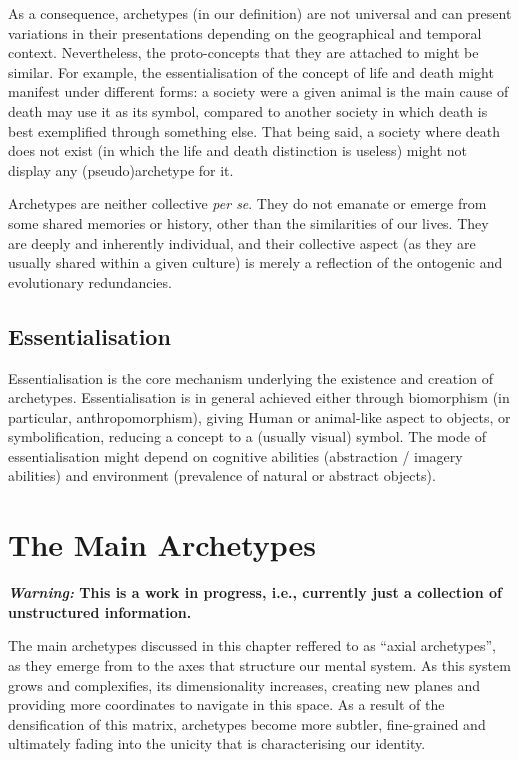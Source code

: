 \documentclass[]{book}
\begin{document}
As a consequence, archetypes (in our definition) are not universal and can present variations in their presentations depending on the geographical and temporal context. Nevertheless, the proto-concepts that they are attached to might be similar. For example, the essentialisation of the concept of life and death might manifest under different forms: a society were a given animal is the main cause of death may use it as its symbol, compared to another society in which death is best exemplified through something else. That being said, a society where death does not exist (in which the life and death distinction is useless) might not display any (pseudo)archetype for it.

Archetypes are neither collective \emph{per se}. They do not emanate or emerge from some shared memories or history, other than the similarities of our lives. They are deeply and inherently individual, and their collective aspect (as they are usually shared within a given culture) is merely a reflection of the ontogenic and evolutionary redundancies.

\hypertarget{essentialisation}{%
\section{Essentialisation}\label{essentialisation}}

Essentialisation is the core mechanism underlying the existence and creation of archetypes. Essentialisation is in general achieved either through biomorphism (in particular, anthropomorphism), giving Human or animal-like aspect to objects, or symbolification, reducing a concept to a (usually visual) symbol. The mode of essentialisation might depend on cognitive abilities (abstraction / imagery abilities) and environment (prevalence of natural or abstract objects).

\hypertarget{the-main-archetypes}{%
\chapter{The Main Archetypes}\label{the-main-archetypes}}

\textbf{\emph{Warning:} This is a work in progress, i.e., currently just a collection of unstructured information.}

The main archetypes discussed in this chapter reffered to as ``axial archetypes'', as they emerge from to the axes that structure our mental system. As this system grows and complexifies, its dimensionality increases, creating new planes and providing more coordinates to navigate in this space. As a result of the densification of this matrix, archetypes become more subtler, fine-grained and ultimately fading into the unicity that is characterising our identity.
\end{document}
